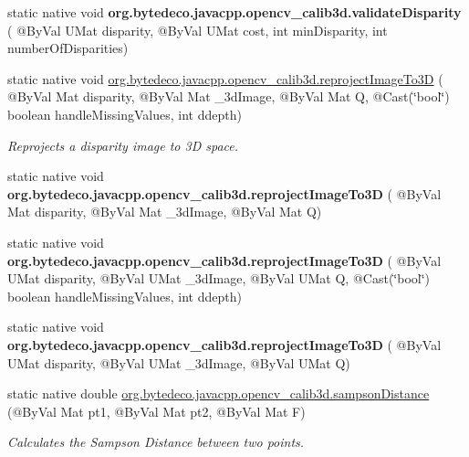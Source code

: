 \begin{DoxyCompactItemize}
\item 
\mbox{\label{group__calib3d_gab091f760832ddb9106fbb405c56a2954}} 
static native void {\bfseries org.\+bytedeco.\+javacpp.\+opencv\+\_\+calib3d.\+validate\+Disparity} ( @By\+Val U\+Mat disparity, @By\+Val U\+Mat cost, int min\+Disparity, int number\+Of\+Disparities)
\item 
static native void \hyperlink{group__calib3d_ga523a57d6b7e1229eed6a1c88b22d0408}{org.\+bytedeco.\+javacpp.\+opencv\+\_\+calib3d.\+reproject\+Image\+To3D} ( @By\+Val Mat disparity, @By\+Val Mat \+\_\+3d\+Image, @By\+Val Mat Q, @Cast(\char`\"{}bool\char`\"{}) boolean handle\+Missing\+Values, int ddepth)
\begin{DoxyCompactList}\small\item\em Reprojects a disparity image to 3D space. \end{DoxyCompactList}\item 
\mbox{\label{group__calib3d_ga7b4f0975d62a50b1eb490a6eb0b74058}} 
static native void {\bfseries org.\+bytedeco.\+javacpp.\+opencv\+\_\+calib3d.\+reproject\+Image\+To3D} ( @By\+Val Mat disparity, @By\+Val Mat \+\_\+3d\+Image, @By\+Val Mat Q)
\item 
\mbox{\label{group__calib3d_ga410bb3b577b61accf1c1382e84ac7c36}} 
static native void {\bfseries org.\+bytedeco.\+javacpp.\+opencv\+\_\+calib3d.\+reproject\+Image\+To3D} ( @By\+Val U\+Mat disparity, @By\+Val U\+Mat \+\_\+3d\+Image, @By\+Val U\+Mat Q, @Cast(\char`\"{}bool\char`\"{}) boolean handle\+Missing\+Values, int ddepth)
\item 
\mbox{\label{group__calib3d_gad2bbcd88c7441efc73cdf36586f62bfc}} 
static native void {\bfseries org.\+bytedeco.\+javacpp.\+opencv\+\_\+calib3d.\+reproject\+Image\+To3D} ( @By\+Val U\+Mat disparity, @By\+Val U\+Mat \+\_\+3d\+Image, @By\+Val U\+Mat Q)
\item 
static native double \hyperlink{group__calib3d_ga708b24ef9e230b1b82f146fb3e7b2377}{org.\+bytedeco.\+javacpp.\+opencv\+\_\+calib3d.\+sampson\+Distance} (@By\+Val Mat pt1, @By\+Val Mat pt2, @By\+Val Mat F)
\begin{DoxyCompactList}\small\item\em Calculates the Sampson Distance between two points. \end{DoxyCompactList}\item 

\end{DoxyCompactItemize}

